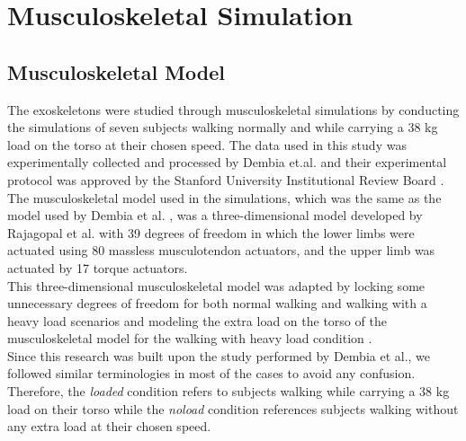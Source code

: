 \documentclass[10pt,letterpaper]{article}
\begin{document}
\section*{Musculoskeletal Simulation}
\subsection*{Musculoskeletal Model}
The exoskeletons were studied through musculoskeletal simulations by conducting the simulations of seven subjects walking normally and while carrying a 38 kg load on the torso at their chosen speed. The data used in this study was experimentally collected and processed by Dembia et.al. \cite{93} and their experimental protocol was approved by the Stanford University Institutional Review Board \cite{93}.\\
The musculoskeletal model used in the simulations, which was the same as the model used by Dembia et al. \cite{93}, was a three-dimensional model developed by Rajagopal et al. \cite{130} with 39 degrees of freedom in which the lower limbs were actuated using 80 massless musculotendon actuators, and the upper limb was actuated by 17 torque actuators\cite{130}. \\
This three-dimensional musculoskeletal model was adapted by locking some unnecessary degrees of freedom for both normal walking and walking with a heavy load scenarios and modeling the extra load on the torso of the musculoskeletal model for the walking with heavy load condition \cite{93}.\\
Since this research was built upon the study performed by Dembia et al., we followed similar terminologies in most of the cases to avoid any confusion. Therefore, the \textit{loaded} condition refers to subjects walking while carrying a 38 kg load on their torso while the \textit{noload} condition references subjects walking without any extra load at their chosen speed.
\end{document}
